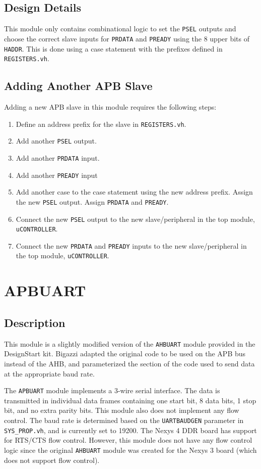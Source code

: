 \subsection{Design Details}
This module only contains combinational logic to set the \texttt{PSEL} outputs and choose the correct slave inputs for \texttt{PRDATA} and \texttt{PREADY} using the 8 upper bits of \texttt{HADDR}. This is done using a case statement with the prefixes defined in \texttt{REGISTERS.vh}.

\subsection{Adding Another APB Slave}
Adding a new APB slave in this module requires the following steps:

\begin{enumerate}
	\item Define an address prefix for the slave in \texttt{REGISTERS.vh}.
	\item Add another \texttt{PSEL} output.
	\item Add another \texttt{PRDATA} input.
	\item Add another \texttt{PREADY} input
	\item Add another case to the case statement using the new address prefix. Assign the new \texttt{PSEL} output. Assign \texttt{PRDATA} and \texttt{PREADY}.
	\item Connect the new \texttt{PSEL} output to the new slave/peripheral in the top module, \texttt{uCONTROLLER}.
	\item Connect the new \texttt{PRDATA} and \texttt{PREADY} inputs to the new slave/peripheral in the top module, \texttt{uCONTROLLER}.
\end{enumerate}

\section{APBUART}
\subsection{Description}
This module is a slightly modified version of the \texttt{AHBUART} module provided in the DesignStart kit. Bigazzi adapted the original code to be used on the APB bus instead of the AHB, and parameterized the section of the code used to send data at the appropriate baud rate.

The \texttt{APBUART} module implements a 3-wire serial interface. The data is transmitted in individual data frames containing one start bit, 8 data bits, 1 stop bit, and no extra parity bits. This module also does not implement any flow control. The baud rate is determined based on the \texttt{UARTBAUDGEN} parameter in \texttt{SYS\_PROP.vh}, and is currently set to 19200. The Nexys 4 DDR board has support for RTS/CTS flow control. However, this module does not have any flow control logic since the original \texttt{AHBUART} module was created for the Nexys 3 board (which does not support flow control).

